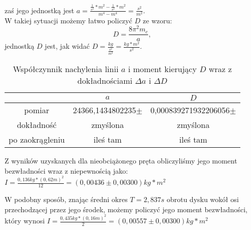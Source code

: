 \documentclass[10pt,a4paper]{article}
\newcommand{\forceindent}{\leavevmode{\parindent=3em\indent}}
\begin{document}
zaś jego jednostką jest $ a=\frac{\frac{1}{s^2}*m^2-\frac{1}{s^2}*m^2}{m^4-m^4}=\frac{s^2}{m^2} $.\\

W takiej sytuacji możemy łatwo policzyć $D$ ze wzoru:
\begin{equation}
D = \frac{8\pi ^2 m_c}{a},
\end{equation}
jednostką $D$ jest, jak widać $ D=\frac{kg}{\frac{s^2}{m^2}}=\frac{kg*m^2}{s^2} $.

\begin{table}[!h]
\centering
\begin{tabular}{|cc||c|}
\multicolumn{1}{c}{} & \multicolumn{1}{c}{$a$} & \multicolumn{1}{c}{$D$}\\
\hline
pomiar & 24366,1434802235$\pm$& 0,000839271932206056$\pm$\\
\hline
dokładność & zmyślona & zmyślona\\
\hline
po zaokrągleniu & ileś tam  & ileś tam \\
\hline
\end{tabular}
\caption{Współczynnik nachylenia linii $a$ i moment kierujący $D$ wraz z dokładnościami $\Delta a$ i $\Delta D$}
\end{table}

\forceindent Z wyników uzyskanych dla nieobciążonego pręta obliczyliśmy jego moment bezwładności wraz z niepewnością jako:
$ I = \frac{0,136kg * (0,62m)^2}{12} = (0,00436 \pm 0,00300) kg*m^2 $

\forceindent W podobny sposób, znając średni okres $T = 2,837 s$ obrotu dysku wokół osi przechodzącej przez jego środek, możemy policzyć jego moment bezwładności, który wynosi
$ I = \frac{0,435kg*(0,16m)^2}{2} = (0,00557 \pm 0,00300) kg*m^2 $
\end{document}

